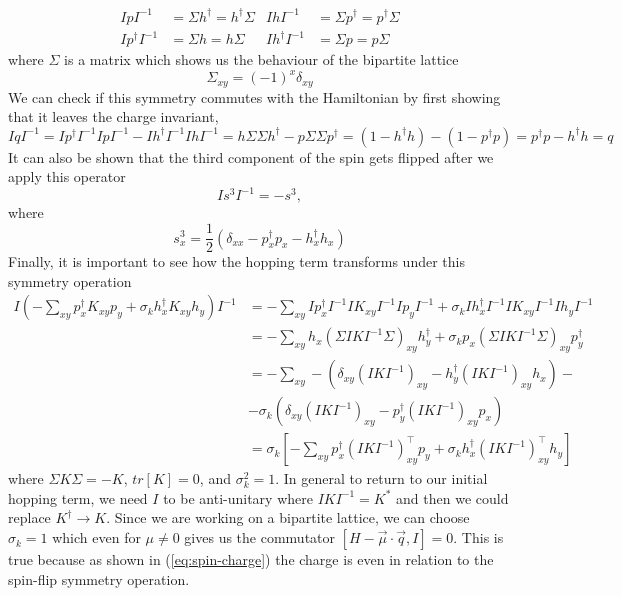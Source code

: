 \begin{align*}
  IpI^{-1} &= \Sigma h^\dagger = h^\dagger \Sigma & IhI^{-1} &= \Sigma p^\dagger = p^\dagger \Sigma \\
  Ip^\dagger I^{-1} &= \Sigma h = h \Sigma & Ih^\dagger I^{-1} &= \Sigma p = p \Sigma
\end{align*}
where $\Sigma$ is a matrix which shows us the behaviour of the bipartite lattice
\begin{equation}
  \Sigma_{xy} = (-1)^x\delta_{xy}
\end{equation}
We can check if this symmetry commutes with the Hamiltonian by first showing that it leaves the charge invariant,
\begin{equation}
  IqI^{-1} = Ip^\dagger I^{-1}IpI^{-1} - Ih^\dagger I^{-1}IhI^{-1} = h\Sigma\Sigma h^\dagger - p\Sigma\Sigma p^\dagger = (1 - h^\dagger h) - (1 - p^\dagger p) = p^\dagger p - h^\dagger h = q
  \label{eq:spin-charge}
\end{equation}
It can also be shown that the third component of the spin gets flipped after we apply this operator
\begin{equation}
  Is^3I^{-1} = -s^3,
\end{equation}
where
\begin{equation}
  s^3_x = \frac{1}{2}\left(\delta_{xx} - p^\dagger_x p_x - h^\dagger_x h_x\right)
\end{equation}
Finally, it is important to see how the hopping term transforms under this symmetry operation
\begin{align*}
  I\left( -\sum_{xy} p^\dagger_x K_{xy} p_y + \sigma_k h^\dagger_x K_{xy} h_y\right) I^{-1} &= -\sum_{xy} I p^\dagger_x I^{-1}I K_{xy} I^{-1}I p_y I^{-1} + \sigma_k I h^\dagger_x I^{-1}I K_{xy} I^{-1}I h_y I^{-1}
  \\
  &= -\sum_{xy}  h_x (\Sigma I K I^{-1}\Sigma)_{xy} h^\dagger_y + \sigma_k p_x (\Sigma I K I^{-1}\Sigma)_{xy} p^\dagger_y
  \\
  &= -\sum_{xy} -(\delta_{xy} (I K I^{-1})_{xy} - h^\dagger_y (I K I^{-1})_{xy} h_x) -
  \\
  &- \sigma_k (\delta_{xy} (I K I^{-1})_{xy} - p^\dagger_y (I K I^{-1})_{xy} p_x)
  \\
  &= \sigma_k \left[-\sum_{xy} p^\dagger_x (I K I^{-1})^\top_{xy} p_y + \sigma_k h^\dagger_x (I K I^{-1})^\top_{xy} h_y \right]
\end{align*}
where $\Sigma K \Sigma = -K$, $tr[K] = 0$, and $\sigma^2_k = 1$. In general to return to our initial hopping term, we need $I$ to be anti-unitary where $IKI^{-1} = K^*$ and then we could replace $K^\dagger\rightarrow K$. Since we are working on a bipartite lattice, we can choose $\sigma_k = 1$ which even for $\mu \neq 0$ gives us the commutator $[H - \vec{\mu}\cdot\vec{q}, I] = 0$. This is true because as shown in (\ref{eq:spin-charge}) the charge is even in relation to the spin-flip symmetry operation.

